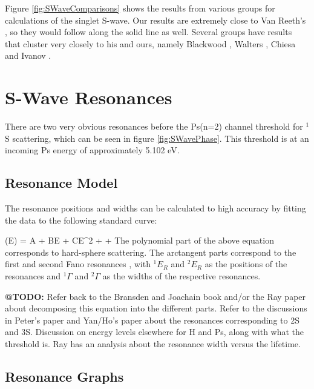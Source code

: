 \documentclass[Dissertation.tex]{subfiles}
\begin{document}
Figure \ref{fig:SWaveComparisons} shows the results from various groups for calculations of the singlet S-wave.  Our results are extremely close to Van Reeth's \cite{VanReeth2003}, so they would follow along the solid line as well.  Several groups have results that cluster very closely to his and ours, namely Blackwood \cite{Blackwood2002}, Walters \cite{Walters2004}, Chiesa \cite{Chiesa2002} and Ivanov \cite{Ivanov2002}.






\section{S-Wave Resonances}
\label{sec:SWaveResonances}

There are two very obvious resonances before the Ps(n=2) channel threshold for $^1$S scattering, which can be seen in figure \ref{fig:SWavePhase}.  This threshold is at an incoming Ps energy of approximately 5.102 eV.  

\subsection{Resonance Model}
\label{sec:ResonanceModel}
The resonance positions and widths can be calculated to high accuracy by fitting the data to the following standard curve:

\beq
\label{eq:ResonanceCurve}
\delta(E) = A + BE + CE^2 + \arctan{} + \arctan{}
\eeq
The polynomial part of the above equation corresponds to hard-sphere scattering. The arctangent parts correspond to the first and second Fano resonances \cite{Fano1961,Macek1970,Hazi1979}, with $^1E_R$ and $^2E_R$ as the positions of the resonances and $^1\Gamma$ and $^2\Gamma$ as the widths of the respective resonances.

\textbf{@TODO:} Refer back to the Bransden and Joachain book and/or the Ray paper about decomposing this equation into the different parts. Refer to the discussions in Peter's paper and Yan/Ho's paper about the resonances corresponding to 2S and 3S.  Discussion on energy levels elsewhere for H and Ps, along with what the threshold is. Ray has an analysis about the resonance width versus the lifetime.
\subsection{Resonance Graphs}
\label{sec:ResonanceGraphs}
\end{document}
